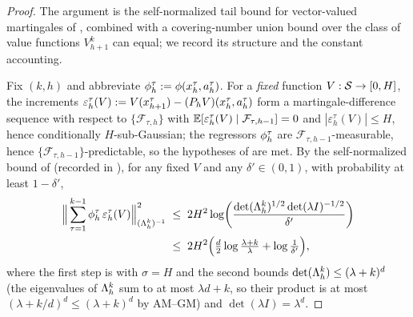 \begin{proof}
The argument is the self-normalized tail bound for vector-valued martingales of
\cite{abbasi2011improved}, combined with a covering-number union bound over the
class of value functions $V_{h+1}^k$ can equal; we record its structure and the
constant accounting.

Fix $(k,h)$ and abbreviate $\phi_h^\tau:=\phi(x_h^\tau,a_h^\tau)$. For a
\emph{fixed} function $V:\mathcal{S}\to[0,H]$, the increments
$\varepsilon_h^\tau(V):= V(x_{h+1}^\tau) - (P_h V)(x_h^\tau,a_h^\tau)$ form a
martingale-difference sequence with respect to $\{\mathcal F_{\tau,h}\}$ with
$\mathbb{E}[\varepsilon_h^\tau(V)\mid\mathcal F_{\tau,h-1}]=0$ and
$|\varepsilon_h^\tau(V)|\le H$, hence conditionally $H$-sub-Gaussian; the
regressors $\phi_h^\tau$ are $\mathcal F_{\tau,h-1}$-measurable, hence
$\{\mathcal F_{\tau,h-1}\}$-predictable, so the hypotheses of
 are met. By the
self-normalized bound of \cite{abbasi2011improved} (recorded in
), for any fixed $V$ and any $\delta'\in(0,1)$, with
probability at least $1-\delta'$,
\begin{align}
\Big\| \sum_{\tau=1}^{k-1} \phi_h^\tau\, \varepsilon_h^\tau(V) \Big\|_{(\Lambda_h^k)^{-1}}^2
&\;\le\; 2H^2 \log\!\bigg( \frac{\det(\Lambda_h^k)^{1/2}\det(\lambda I)^{-1/2}}{\delta'} \bigg) \notag \\
&\;\le\; 2H^2 \Big( \tfrac{d}{2}\log\tfrac{\lambda+k}{\lambda} + \log\tfrac{1}{\delta'} \Big), \label{eq:sn-fixed}
\end{align}
where the first step is  with $\sigma=H$ and the
second bounds $\det(\Lambda_h^k)\le(\lambda+k)^d$ (the eigenvalues of $\Lambda_h^k$
sum to at most $\lambda d+k$, so their product is at most $(\lambda+k/d)^d\le
(\lambda+k)^d$ by AM--GM) and $\det(\lambda I)=\lambda^d$.


\end{proof}
